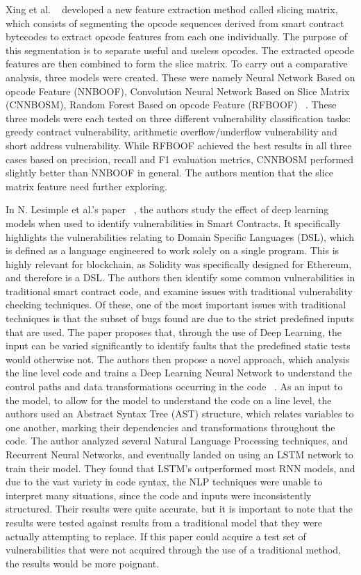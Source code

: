 Xing et al. ~\cite{hu2021comprehensive} developed a new feature extraction method called slicing matrix, which consists of segmenting the opcode sequences derived from
smart contract bytecodes to extract opcode features from each one individually.
The purpose of this segmentation is to separate useful and useless opcodes.
The extracted opcode features are then combined to form the slice matrix.
To carry out a comparative analysis, three models were created.
These were namely Neural Network Based on opcode Feature (NNBOOF), Convolution Neural Network Based on Slice Matrix (CNNBOSM), Random Forest Based on opcode Feature
(RFBOOF) ~\cite{hu2021comprehensive}.
These three models were each tested on three different vulnerability classification tasks: greedy contract vulnerability, arithmetic overflow/underflow vulnerability and short address vulnerability.
While RFBOOF achieved the best results in all three cases based on precision, recall and F1 evaluation metrics, CNNBOSM performed slightly better than NNBOOF in general.
The authors mention that the slice matrix feature need further exploring.

In N. Lesimple et al.'s paper ~\cite{day2019ethereum}, the authors study the effect of deep learning models when used to identify vulnerabilities in Smart Contracts.
It specifically highlights the vulnerabilities relating to Domain Specific Languages (DSL), which is defined as a language engineered to work solely on a single program.
This is highly relevant for blockchain, as Solidity was specifically designed for Ethereum, and therefore is a DSL.
The authors then identify some common vulnerabilities in traditional smart contract code, and examine issues with traditional vulnerability checking techniques.
Of these, one of the most important issues with traditional techniques is that the subset of bugs found are due to the strict predefined inputs that are used.
The paper proposes that, through the use of Deep Learning, the input can be varied significantly to identify faults that the predefined static tests would otherwise not.
The authors then propose a novel approach, which analysis the line level code and trains a Deep Learning Neural Network to understand the
control paths and data transformations occurring in the code ~\cite{day2019ethereum}.
As an input to the model, to allow for the model to understand the code on a line level, the authors used an Abstract Syntax Tree (AST) structure,
which relates variables to one another, marking their
dependencies and transformations throughout the code.
The author analyzed several Natural Language Processing techniques, and Recurrent Neural Networks, and eventually landed on using an LSTM network to train their model.
They found that LSTM's outperformed most RNN models, and due to the vast variety in code syntax, the NLP techniques were unable to interpret many situations, since the code and inputs were inconsistently structured.
Their results were quite accurate, but it is important to note that the results were tested against results from a traditional model that they were actually attempting to replace.
If this paper could acquire a test set of vulnerabilities that were not acquired through the use of a traditional method, the results would be more poignant.

